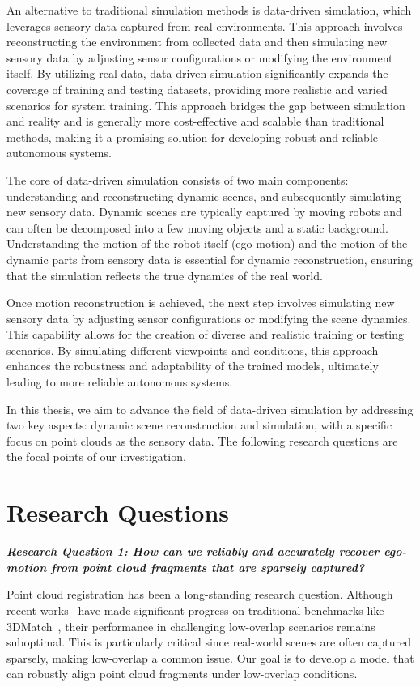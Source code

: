 An alternative to traditional simulation methods is data-driven simulation, which leverages sensory data captured from real environments. This approach involves reconstructing the environment from collected data and then simulating new sensory data by adjusting sensor configurations or modifying the environment itself. By utilizing real data, data-driven simulation significantly expands the coverage of training and testing datasets, providing more realistic and varied scenarios for system training. This approach bridges the gap between simulation and reality and is generally more cost-effective and scalable than traditional methods, making it a promising solution for developing robust and reliable autonomous systems.

The core of data-driven simulation consists of two main components: understanding and reconstructing dynamic scenes, and subsequently simulating new sensory data. Dynamic scenes are typically captured by moving robots and can often be decomposed into a few moving objects and a static background. Understanding the motion of the robot itself (ego-motion) and the motion of the dynamic parts from sensory data is essential for dynamic reconstruction, ensuring that the simulation reflects the true dynamics of the real world.

Once motion reconstruction is achieved, the next step involves simulating new sensory data by adjusting sensor configurations or modifying the scene dynamics. This capability allows for the creation of diverse and realistic training or testing scenarios. By simulating different viewpoints and conditions, this approach enhances the robustness and adaptability of the trained models, ultimately leading to more reliable autonomous systems.

In this thesis, we aim to advance the field of data-driven simulation by addressing two key aspects: dynamic scene reconstruction and simulation, with a specific focus on point clouds as the sensory data. The following research questions are the focal points of our investigation.

\section{Research Questions}

\noindent
\textbf{\textit{Research Question 1: How can we reliably and accurately recover ego-motion from point cloud fragments that are sparsely captured?}}

Point cloud registration has been a long-standing research question. Although recent works~\cite{gojcic2018learned,Choy2019FCGF} have made significant progress on traditional benchmarks like 3DMatch~\cite{zeng20163dmatch}, their performance in challenging low-overlap scenarios remains suboptimal. This is particularly critical since real-world scenes are often captured sparsely, making low-overlap a common issue. Our goal is to develop a model that can robustly align point cloud fragments under low-overlap conditions.

